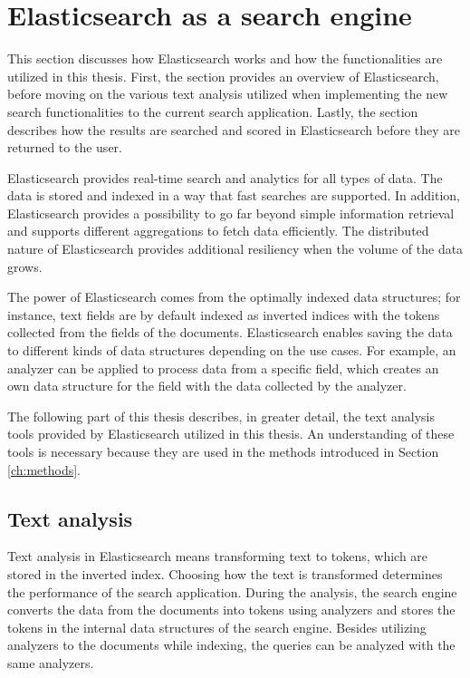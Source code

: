 
\section{Elasticsearch as a search engine}
\label{sec:elasticsearch}
This section discusses how Elasticsearch works and how the functionalities are utilized in this thesis.
First, the section provides an overview of Elasticsearch, before moving on the various text analysis 
utilized when implementing the new search functionalities to the current search application.
Lastly, the section describes how the results are searched and scored in Elasticsearch before they 
are returned to the user.


Elasticsearch provides real-time search and analytics for all types of data.
The data is stored and indexed in a way that fast searches are supported.
In addition, Elasticsearch provides a possibility to go far beyond simple information retrieval and supports
different aggregations to fetch data efficiently. 
The distributed nature of Elasticsearch provides additional resiliency when the volume of the data 
grows. 
\cite{elasticIntro}


The power of Elasticsearch comes from the optimally indexed data structures; for instance, text fields are by default
indexed as inverted indices with the tokens collected from the fields of the documents.
Elasticsearch enables saving the data to different kinds of data structures depending on the use cases.
For example, an analyzer can be applied to process data from a specific field,
which creates an own data structure for the field with the data collected by the analyzer.
\cite{elasticIntro}


The following part of this thesis describes, in greater detail,
the text analysis tools provided by Elasticsearch utilized in this thesis.
An understanding of these tools is necessary because they are used in 
the methods introduced in Section \ref{ch:methods}.



\subsection{Text analysis}
\label{ss:textAnalysisTools}

Text analysis in Elasticsearch means transforming text to tokens, which are stored in the inverted index.
Choosing how the text is transformed determines the performance of the search application.
During the analysis, the search engine converts the data from the documents into tokens using analyzers
and stores the tokens in the internal data structures of the search engine.
Besides utilizing analyzers to the documents while indexing, 
the queries can be analyzed with the same analyzers.
\cite{relevantSearch}

